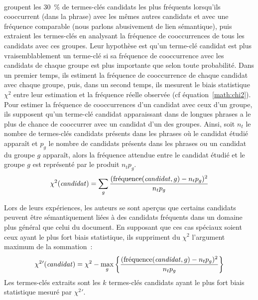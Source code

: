         ~\\ groupent les 30~\% de termes-clés
        candidats les plus fréquents lorsqu'ils cooccurrent (dans la phrase) avec les
        mêmes autres candidats et avec une fréquence comparable (nous parlons
        abusivement de lien sémantique), puis extraient les termes-clés en
        analysant la fréquence de cooccurrences de tous les candidats avec ces groupes.
        Leur hypothèse est qu'un terme-clé candidat est plus vraisemblablement un
        terme-clé si sa fréquence de cooccurrence avec les candidats de chaque
        groupe est plus importante que selon toute probabilité. Dans un premier
        temps, ils estiment la fréquence de cooccurrence de chaque candidat avec
        chaque groupe, puis, dans un second temps, ils mesurent le biais
        statistique $\chi^2$ entre leur estimation et la fréquence réelle
        observée (cf équation~\ref{math:chi2}). Pour estimer la fréquence de
        cooccurrences d'un candidat avec ceux d'un groupe, ils supposent qu'un
        terme-clé candidat apparaissant dans de longues phrases a le plus de
        chance de cooccurrer avec un candidat d'un des groupes. Ainsi, soit
        $n_t$ le nombre de termes-clés candidats présents dans les phrases où le
        candidat étudié apparaît et $p_g$ le nombre de candidats présents dans
        les phrases ou un candidat du groupe $g$ apparaît, alors la fréquence
        attendue entre le candidat étudié et le groupe $g$ est représenté par le
        produit $n_tp_g$.
        \begin{align}
          \chi^2(\text{\textit{candidat}}) = \sum_{g} \frac{(\text{fréquence}(\text{\textit{candidat}}, g) - n_tp_g)^2}{n_tp_g} \label{math:chi2}
        \end{align}
        
        Lors de leurs expériences, les auteurs se sont aperçus que certains
        candidats peuvent être sémantiquement liées à des candidats fréquents
        dans un domaine plus général que celui du document. En supposant que ces
        cas spéciaux soient ceux ayant le plus fort biais statistique, ils
        suppriment du $\chi^2$ l'argument maximum de la sommation~:
        \begin{align}
          \chi^2{'}(\text{\textit{candidat}}) = \chi^2 - \max_{g}\left\{\frac{(\text{fréquence}(\text{\textit{candidat}}, g) - n_tp_g)^2}{n_tp_g}\right\}
        \end{align}
        Les termes-clés extraits sont les $k$ termes-clés candidats ayant le
        plus fort biais statistique mesuré par $\chi^2{'}$.

